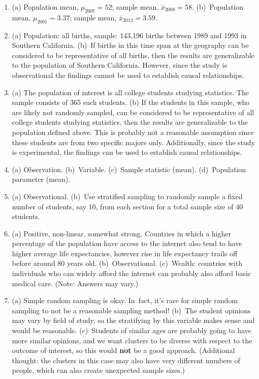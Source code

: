\documentclass[
  10pt,
  openany]{book}
\providecommand{\tightlist}{%
  \setlength{\itemsep}{0pt}\setlength{\parskip}{0pt}}
\begin{document}
\begin{enumerate}
\def\labelenumi{\arabic{enumi}.}
\tightlist
\item
  (a) Population mean, \(\mu_{2007} = 52\); sample mean, \(\bar{x}_{2008} = 58\). (b)~Population mean, \(\mu_{2001} = 3.37\); sample mean, \(\bar{x}_{2012} = 3.59\).

  \addtocounter{enumi}{1}
\item
  (a) Population: all births, sample: 143,196 births between 1989 and 1993 in Southern California. (b)~If births in this time span at the geography can be considered to be representative of all births, then the results are generalizable to the population of Southern California. However, since the study is observational the findings cannot be used to establish causal relationships.

  \addtocounter{enumi}{1}
\item
  (a) The population of interest is all college students studying statistics. The sample consists of 365 such students. (b) If the students in this sample, who are likely not randomly sampled, can be considered to be representative of all college students studying statistics, then the results are generalizable to the population defined above. This is probably not a reasonable assumption since these students are from two specific majors only. Additionally, since the study is experimental, the findings can be used to establish causal relationships.

  \addtocounter{enumi}{1}
\item
  (a) Observation. (b)~Variable. (c)~Sample statistic (mean).
  (d)~Population parameter (mean).

  \addtocounter{enumi}{1}
\item
  (a) Observational. (b)~Use stratified sampling to randomly sample a fixed number of students, say 10, from each section for a total sample size of 40 students.

  \addtocounter{enumi}{1}
\item
  (a) Positive, non-linear, somewhat strong. Countries in which a higher percentage of the population have access to the internet also tend to have higher average life expectancies, however rise in life expectancy trails off before around 80 years old. (b)~Observational. (c)~Wealth: countries with individuals who can widely afford the internet can probably also afford basic medical care. (Note: Answers may vary.)

  \addtocounter{enumi}{1}
\item
  (a) Simple random sampling is okay. In~fact, it's rare for simple random sampling to not be a reasonable sampling method! (b)~The student opinions may vary by field of study, so the stratifying by this variable makes sense and would be reasonable. (c)~Students of similar ages are probably going to have more similar opinions, and we want clusters to be diverse with respect to the outcome of interest, so this would \textbf{not} be a good approach. (Additional thought: the clusters in this case may also have very different numbers of people, which can also create unexpected sample sizes.)


\end{enumerate}
\end{document}
